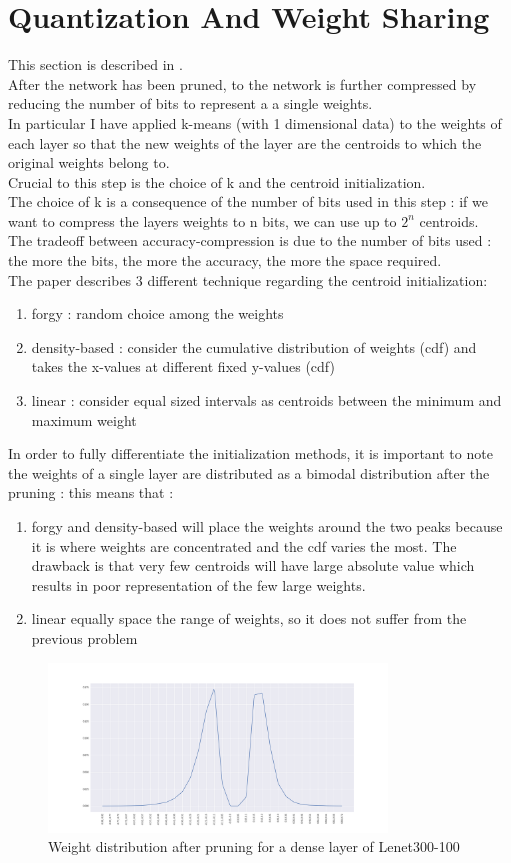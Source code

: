 \documentclass[journal]{vgtc}                %
\begin{document}
\section{Quantization And Weight Sharing}
This section is described in \cite{p2}.\\After the network has been pruned, to the network is further compressed by reducing the number of bits to represent a a single weights.\\In particular I have applied k-means (with 1 dimensional data) to the weights of each layer so that the new weights of the layer are the centroids to which the original weights belong to.\\Crucial to this step is the choice of k and the centroid initialization.\\The choice of k is a consequence of the number of bits used in this step : if we want to compress the layers weights to n bits, we can use up to $2^{n}$ centroids.\\The tradeoff between accuracy-compression is due to the number of bits used : the more the bits, the more the accuracy, the more the space required.\\The paper describes 3 different technique regarding the centroid initialization:
\begin{enumerate}
\item forgy : random choice among the weights 
\item density-based : consider the cumulative distribution of weights (cdf) and takes the x-values at different fixed y-values (cdf)
\item linear : consider equal sized intervals as centroids between the minimum and maximum weight
\end{enumerate}
In order to fully differentiate the initialization methods, it is important to note  the weights of a single layer are distributed as a bimodal distribution after the pruning : this means that :
\begin{enumerate}
\item forgy and density-based will place the weights around the two peaks because it is where weights are concentrated and the cdf varies the most. The drawback is that very few centroids will have large absolute value which results in poor representation of the few large weights.
\item linear equally space the range of weights, so it does not suffer from the previous problem
\end{enumerate}
\begin{figure}[H]
	\includegraphics[width=90mm,scale=0.7]{weights-after-pruning}
	\caption{Weight distribution  after pruning for a dense layer of Lenet300-100 }
\end{figure}
\end{document}
